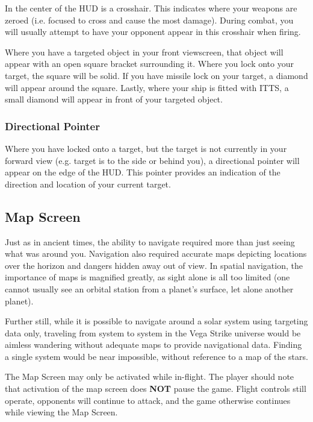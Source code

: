 \documentclass{article}
\begin{document}
In the center of the HUD is a crosshair. This indicates where your weapons are zeroed (i.e. focused to cross and cause the most damage). During combat, you will usually attempt to have your opponent appear in this crosshair when firing. 



Where you have a targeted object in your front viewscreen, that object will appear with an open square bracket surrounding it. Where you lock onto your target, the square will be solid. If you have missile lock on your target, a diamond will appear around the square. Lastly, where your ship is fitted with ITTS, a small diamond will appear in front of your targeted object. 

\subsubsection{Directional Pointer }

Where you have locked onto a target, but the target is not currently in your forward view (e.g. target is to the side or behind you), a directional pointer will appear on the edge of the HUD. This pointer provides an indication of the direction and location of your current target. 

\subsection{ Map Screen }

Just as in ancient times, the ability to navigate required more than just seeing what was around you. Navigation also required accurate maps depicting locations over the horizon and dangers hidden away out of view. In spatial navigation, the importance of maps is magnified greatly, as sight alone is all too limited (one cannot usually see an orbital station from a planet's surface, let alone another planet). 


Further still, while it is possible to navigate around a solar system using targeting data only, traveling from system to system in the Vega Strike universe would be aimless wandering without adequate maps to provide navigational data. Finding a single system would be near impossible, without reference to a map of the stars. 


The Map Screen may only be activated while in-flight. The player should note that activation of the map screen does \textbf{NOT} pause the game. Flight controls still operate, opponents will continue to attack, and the game otherwise continues while viewing the Map Screen. 
\end{document}
